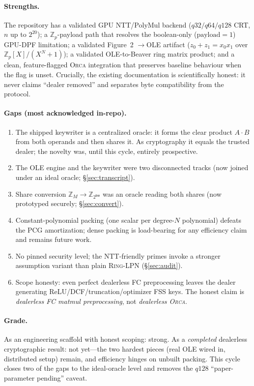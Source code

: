\documentclass[11pt]{article}
\newcommand{\Z}{\mathbb{Z}}
\newcommand{\modtwo}{\Z_{2^{\mathsf{bw}}}}
\newcommand{\Orca}{\textsc{Orca}}
\newcommand{\RingLPN}{\textsc{Ring-LPN}}
\newcommand{\SPFSS}{\mathsf{SPFSS}}
\begin{document}
\paragraph{Strengths.} The repository has a validated GPU NTT/PolyMul backend
($q32/q64/q128$ CRT, $n$ up to $2^{20}$); a $\Z_p$-payload \SPFSS{} path that
resolves the boolean-only ($\text{payload}=1$) GPU-DPF limitation; a validated
Figure~2 \SPFSS{}$\to$OLE artifact ($z_0+z_1=x_0x_1$ over
$\Z_p[X]/(X^N+1)$); a validated OLE-to-Beaver ring matrix product; and a clean,
feature-flagged \Orca{} integration that preserves baseline behaviour when the
flag is unset. Crucially, the existing documentation is scientifically honest:
it never claims ``dealer removed'' and separates byte compatibility from the
protocol.

\paragraph{Gaps (most acknowledged in-repo).}
\begin{enumerate}[leftmargin=*]
  \item The shipped keywriter is a centralized oracle: it forms the clear product
  $A\cdot B$ from both operands and then shares it. As cryptography it equals the
  trusted dealer; the novelty was, until this cycle, entirely prospective.
  \item The OLE engine and the keywriter were two disconnected tracks (now
  joined under an ideal oracle; \S\ref{sec:transcript}).
  \item Share conversion $\Z_M\!\to\!\modtwo$ was an oracle reading both shares
  (now prototyped securely; \S\ref{sec:convert}).
  \item Constant-polynomial packing (one scalar per degree-$N$ polynomial)
  defeats the PCG amortization; dense packing is load-bearing for any efficiency
  claim and remains future work.
  \item No pinned security level; the NTT-friendly primes invoke a stronger
  assumption variant than plain \RingLPN{} (\S\ref{sec:audit}).
  \item Scope honesty: even perfect dealerless FC preprocessing leaves the dealer
  generating ReLU/DCF/truncation/optimizer FSS keys. The honest claim is
  \emph{dealerless FC matmul preprocessing}, not \emph{dealerless \Orca{}}.
\end{enumerate}

\paragraph{Grade.} As an engineering scaffold with honest scoping: strong. As a
\emph{completed} dealerless cryptographic result: not yet---the two hardest
pieces (real OLE wired in, distributed setup) remain, and efficiency hinges on
unbuilt packing. This cycle closes two of the gaps to the ideal-oracle level and
removes the $q128$ ``paper-parameter pending'' caveat.
\end{document}

